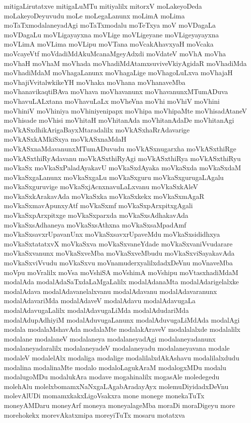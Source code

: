 {mitigaLirutatxve
mitigaLuMTu
mitiyalilx
mitorxV
moLakeyoDeda
moLakeyoDeyuvudu
moLe
moLegaLanunx
moLimA
moLima
moTaTxmodalaneyadAgi
moTaTxmodalu
moTeTxya
moV
moVDagaLa
moVDagaLu
moVLigayayxna
moVLige
moVLigeyane
moVLigeyayayxna
moVLimA
moVLima
moVLipu
moVTana
moVcakAhavxyaH
moVcaka
moVcayeVtf
moVdadiMdAkuMcanaMgeyAdxdi
moVdateV
moVhA
moVha
moVhaH
moVhaM
moVhada
moVhadiMdAtamxsuviveVkiyAgidaR
moVhadiMda
moVhadiMdaM
moVhagaLanunx
moVhagaLige
moVhagoLuLxva
moVhajaH
moVhajiVvitalwkikeYH
moVhaka
moVhana
moVhanaveMba
moVhanavikaqtiBAva
moVhava
moVhavanunx
moVhavanunxMTumADuva
moVhavuLALxtana
moVhavuLaLx
moVheVna
moVhi
moVhiV
moVhini
moVhiniV
moVhiniya
moVhiniyenipapx
moVhipa
moVhipaMte
moVhisadAtaneV
moVhisade
moVhisi
moVhitaH
moVhitanAda
moVhitanAdaDe
moVhitanAgi
moVkASxdhikArigaBayxMtaradalilx
moVkASxhaRrAdavarige
moVkASxkAMkiSxya
moVkASxnaMdaH
moVkASxnaMdavanunxMTumADuvudu
moVkASxnugarxha
moVkASxthiRge
moVkASxthiRyAdavanu
moVkASxthiRyAgi
moVkASxthiRya
moVkASxthiRyu
moVkaSx
moVkaSxPaladAyakavU
moVkaSxdAyaka
moVkaSxda
moVkaSxdaM
moVkaSxgaLanunx
moVkaSxgaLu
moVkaSxguru
moVkaSxgurugaLAgalu
moVkaSxguruvige
moVkaSxjAcnxnavuLaLxvanu
moVkaSxkAleV
moVkaSxkArakavAda
moVkaSxka
moVkaSxkekx
moVkaSxmAgaR
moVkaSxmavApunxyAtf
moVkaSxmf
moVkaSxpArxpitxgAgali
moVkaSxpArxpitxge
moVkaSxparxda
moVkaSxsAdhakavAda
moVkaSxsAdhaneya
moVkaSxsAthxna
moVkaSxsaMpadAmf
moVkaSxsavxrUpavanUnx
moVkaSxsavxrUpaveMdu
moVkaSxsididhxya
moVkaSxtatatxvX
moVkaSxva
moVkaSxvaneYdade
moVkaSxvaniVvudarare
moVkaSxvanunx
moVkaSxveMba
moVkaSxveMbudu
moVkaSxviSayakavAda
moVkaSxviVvudu
moVkaSxvu
moVnamuderxyalilxdadxDeVnu
moVnaveMba
moVpu
moVralilx
moVsa
moVshiSA
moVshimA
moVshipu
moVtasxhadiMdaM
modalAda
modalAdaSaTxdaLaMgaLalilx
modalAdanaMta
modalAdarigelalxke
modalAdava
modalAdavanelalxvanu
modalAdavanu
modalAdavaranunx
modalAdavariMda
modalAdaveV
modalAdavu
modalAdavugaLa
modalAdavugaLalilx
modalAdavugaLiMda
modalAdudariMda
modalAdupAdhiyiM
modalAduvugaLanunx
modalAduvugaLiMdAda
modalAgi
modala
modalaMshavAda
modalaMte
modalakAraveV
modalalalxde
modalalilx
modalane
modalaneV
modalaneya
modalaneyadAgi
modalaneyadanunx
modalaneyadaralilx
modalaneyadeV
modalaneyadu
modalaneyavana
modale
modaleV
modalelAlx
modaliga
modalige
modalilalxdAkAshavu
modalilalxdudu
modalina
modalinaMte
modalo
modaloLagukAraM
modalogxMDu
modalu
modalugoMDu
modalukAra
modave
mogahinalilx
mogasAle
moledegedu
molehAlu
molelxbomamxNaNxgaLAgabAradayAyx
molemuDiyidadxDeVnu
molevAlUDi
momamxkakxLigoVsakxra
mone
monege
monekaTuTx
moneyAMDaru
moneyArf
moneya
moneyalageMba
moraDi
moraDigeyu
more
morehokekx
morevAkatxmipa
moreyiTuTx
mosaru
motatxva
}
